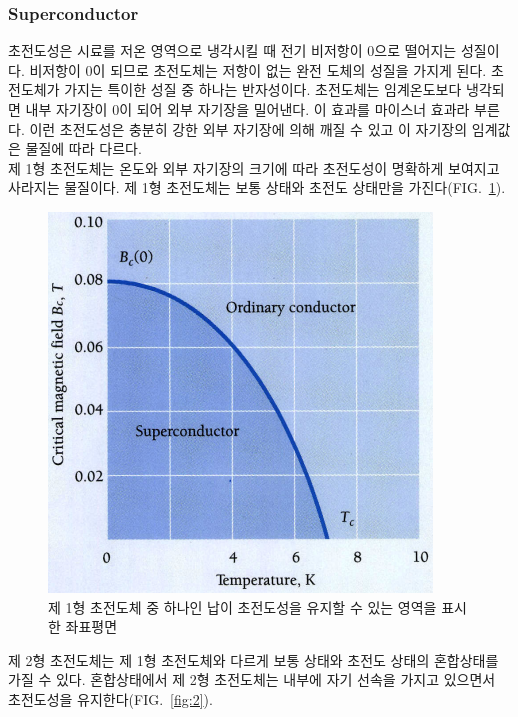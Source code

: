 \documentclass[aps,reprint,superscriptaddress,10pt]{revtex4-2}
\begin{document}
\subsubsection{Superconductor}
초전도성은 시료를 저온 영역으로 냉각시킬 때 전기 비저항이 0으로 떨어지는 성질이다.
비저항이 0이 되므로 초전도체는 저항이 없는 완전 도체의 성질을 가지게 된다.
초전도체가 가지는 특이한 성질 중 하나는 반자성이다. 초전도체는 임계온도보다 냉각되면
내부 자기장이 0이 되어 외부 자기장을 밀어낸다. 이 효과를 마이스너 효과라 부른다. 
이런 초전도성은 충분히 강한 외부 자기장에 의해 깨질 수 있고 이 자기장의 임계값은
물질에 따라 다르다. \\
제 1형 초전도체는 온도와 외부 자기장의 크기에 따라 초전도성이 명확하게 보여지고 사라지는
물질이다. 제 1형 초전도체는 보통 상태와 초전도 상태만을 가진다(FIG.~\ref{fig:1}). 
\begin{figure}[htbp]
  \centering
  \includegraphics[scale = 0.5]{1.png}
  \caption{제 1형 초전도체 중 하나인 납이 초전도성을 유지할 수 있는 영역을 표시한 좌표평면}
  \label{fig:1}
\end{figure}

제 2형 초전도체는 제 1형 초전도체와 다르게 보통 상태와 초전도 상태의 혼합상태를 가질 수 있다.
혼합상태에서 제 2형 초전도체는 내부에 자기 선속을 가지고 있으면서 
초전도성을 유지한다(FIG.~\ref{fig:2}).
\end{document}

